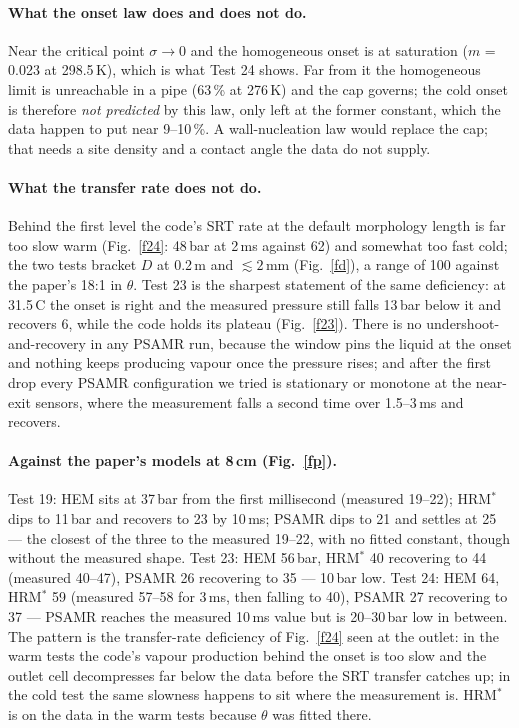 \documentclass[11pt,a4paper]{article}
\begin{document}
\paragraph{What the onset law does and does not do.} Near the critical point $\sigma \to 0$ and the homogeneous onset is at saturation ($m$ = 0.023 at 298.5\,K), which is what Test 24 shows. Far from it the homogeneous limit is unreachable in a pipe (63\,\% at 276\,K) and the cap governs; the cold onset is therefore \emph{not predicted} by this law, only left at the former constant, which the data happen to put near 9--10\,\%. A wall-nucleation law would replace the cap; that needs a site density and a contact angle the data do not supply.

\paragraph{What the transfer rate does not do.} Behind the first level the code's SRT rate at the default morphology length is far too slow warm (Fig.~\ref{f24}: 48\,bar at 2\,ms against 62) and somewhat too fast cold; the two tests bracket $D$ at 0.2\,m and $\lesssim 2$\,mm (Fig.~\ref{fd}), a range of 100 against the paper's 18:1 in $\theta$. Test 23 is the sharpest statement of the same deficiency: at 31.5\,\textdegree C the onset is right and the measured pressure still falls 13\,bar below it and recovers 6, while the code holds its plateau (Fig.~\ref{f23}). There is no undershoot-and-recovery in any PSAMR run, because the window pins the liquid at the onset and nothing keeps producing vapour once the pressure rises; and after the first drop every PSAMR configuration we tried is stationary or monotone at the near-exit sensors, where the measurement falls a second time over 1.5--3\,ms and recovers.

\paragraph{Against the paper's models at 8\,cm (Fig.~\ref{fp}).} Test 19: HEM sits at 37\,bar from the first millisecond (measured 19--22); HRM$^*$ dips to 11\,bar and recovers to 23 by 10\,ms; PSAMR dips to 21 and settles at 25 --- the closest of the three to the measured 19--22, with no fitted constant, though without the measured shape. Test 23: HEM 56\,bar, HRM$^*$ 40 recovering to 44 (measured 40--47), PSAMR 26 recovering to 35 --- 10\,bar low. Test 24: HEM 64, HRM$^*$ 59 (measured 57--58 for 3\,ms, then falling to 40), PSAMR 27 recovering to 37 --- PSAMR reaches the measured 10\,ms value but is 20--30\,bar low in between. The pattern is the transfer-rate deficiency of Fig.~\ref{f24} seen at the outlet: in the warm tests the code's vapour production behind the onset is too slow and the outlet cell decompresses far below the data before the SRT transfer catches up; in the cold test the same slowness happens to sit where the measurement is. HRM$^*$ is on the data in the warm tests because $\theta$ was fitted there.
\end{document}
